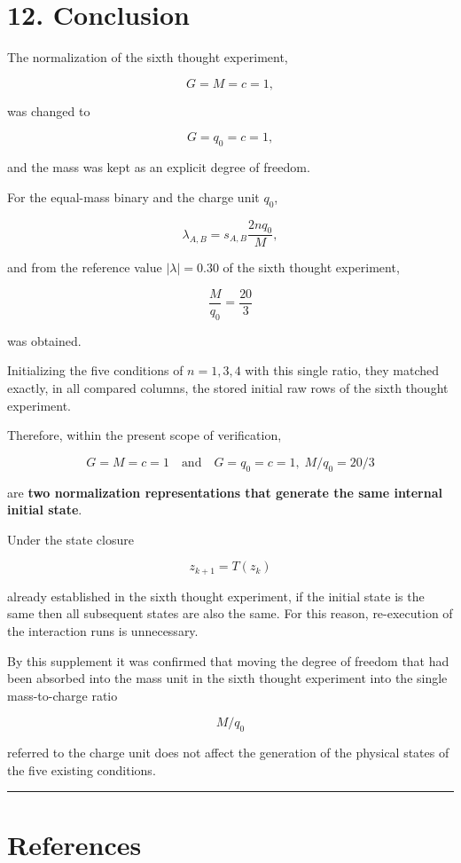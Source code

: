\documentclass[
  a4paper,
]{article}
\begin{document}
\section{12. Conclusion}\label{conclusion}

The normalization of the sixth thought experiment,

\[
G=M=c=1,
\]

was changed to

\[
G=q_0=c=1,
\]

and the mass was kept as an explicit degree of freedom.

For the equal-mass binary and the charge unit \(q_0\),

\[
\lambda_{A,B}=s_{A,B}\frac{2nq_0}{M},
\]

and from the reference value \(|\lambda|=0.30\) of the sixth thought
experiment,

\[
\boxed{\frac{M}{q_0}=\frac{20}{3}}
\]

was obtained.

Initializing the five conditions of \(n=1,3,4\) with this single ratio,
they matched exactly, in all compared columns, the stored initial raw
rows of the sixth thought experiment.

Therefore, within the present scope of verification,

\[
\boxed{
G=M=c=1
\quad\text{and}\quad
G=q_0=c=1,\;M/q_0=20/3
}
\]

are \textbf{two normalization representations that generate the same
internal initial state}.

Under the state closure

\[
z_{k+1}=T(z_k)
\]

already established in the sixth thought experiment, if the initial
state is the same then all subsequent states are also the same. For this
reason, re-execution of the interaction runs is unnecessary.

By this supplement it was confirmed that moving the degree of freedom
that had been absorbed into the mass unit in the sixth thought
experiment into the single mass-to-charge ratio

\[
\boxed{M/q_0}
\]

referred to the charge unit does not affect the generation of the
physical states of the five existing conditions.

\begin{center}\rule{0.5\linewidth}{0.5pt}\end{center}

\section{References}\label{references}
\end{document}
